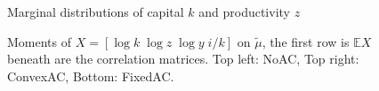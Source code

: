 \documentclass[12pt,english]{article}
\theoremstyle{remark}
\newcommand{\E}{\mathbb{E}}
\begin{document}
\begin{figure}
		
		\caption{Marginal distributions of capital $k$ and productivity $z$}
		\label{fig:main}
	\end{figure}
	
	\begin{figure}
		\begin{minipage}{.5\linewidth}
			\centering
		\end{minipage}%
		\begin{minipage}{.5\linewidth}
			\centering
		\end{minipage}\par\medskip
		\centering
		
		\caption{Moments of $X = [\log k \; \log z \; \log y \; i/k]$ on $\tilde \mu$, the first row is $\E X$ beneath are the correlation matrices. Top left: NoAC, Top right: ConvexAC, Bottom: FixedAC.}
	\end{figure}
	
\end{document}
